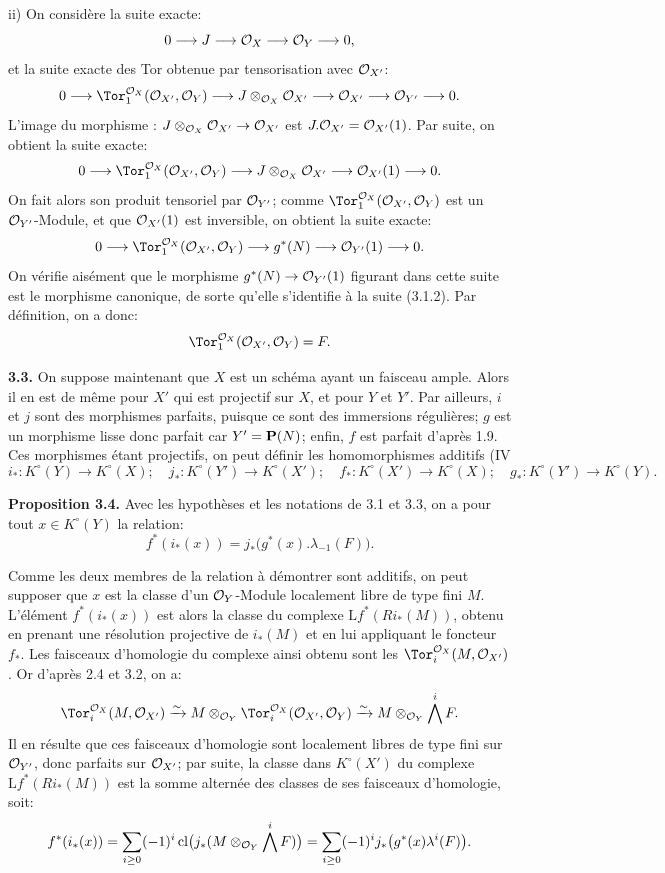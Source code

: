 ii) On considère la suite exacte:
\[
0\longrightarrow J\longrightarrow\mathcal O_X\longrightarrow\mathcal O_Y\longrightarrow0,
\]
et la
suite exacte des Tor obtenue par tensorisation avec \(\mathcal O_{X'}\):
\[
0\longrightarrow
\Tor_1^{\cO_X}(\cO_{X'},\cO_Y)
\longrightarrow
J\otimes_{\cO_X}\cO_{X'}
\longrightarrow
\cO_{X'}
\longrightarrow
\cO_{Y'}
\longrightarrow0.
\]
L'image du morphisme : \(J\otimes_{\mathcal O_X}\mathcal O_{X'}\to\mathcal O_{X'}\) est
\(J.\mathcal O_{X'}=\mathcal O_{X'}(1)\). Par suite, on obtient la suite exacte:
\[
0\longrightarrow
\Tor_1^{\cO_X}(\cO_{X'},\cO_Y)
\longrightarrow
J\otimes_{\cO_X}\cO_{X'}
\longrightarrow
\cO_{X'}(1)
\longrightarrow0.
\]
On fait alors son produit tensoriel par \(\mathcal O_{Y'}\); comme
\(\Tor_1^{\cO_X}(\cO_{X'},\cO_Y)\) est un \(\mathcal O_{Y'}\)-Module, et que
\(\mathcal O_{X'}(1)\) est inversible, on obtient la suite exacte:
\[
0\longrightarrow
\Tor_1^{\cO_X}(\cO_{X'},\cO_Y)
\longrightarrow
g^*(N)
\longrightarrow
\cO_{Y'}(1)
\longrightarrow0.
\]
On vérifie aisément que le morphisme \(g^*(N)\to\mathcal O_{Y'}(1)\) figurant dans cette suite est le morphisme canonique, de sorte qu'elle s'identifie à la suite (3.1.2). Par définition, on a donc:
\[
\Tor_1^{\cO_X}(\cO_{X'},\cO_Y)=F.
\]

\textbf{3.3.} On suppose maintenant que \(X\) est un schéma ayant un faisceau ample. Alors il en est de même pour \(X'\) qui est projectif sur \(X\), et pour \(Y\) et \(Y'\). Par ailleurs, \(i\) et \(j\) sont des morphismes parfaits, puisque ce sont des immersions régulières; \(g\) est un morphisme lisse donc parfait car \(Y'=\mathbf P(N)\); enfin, \(f\) est parfait d'après 1.9. Ces morphismes étant projectifs, on peut définir les homomorphismes additifs (IV
\[
i_*:K^\circ(Y)\to K^\circ(X);\quad
j_*:K^\circ(Y')\to K^\circ(X');\quad
f_*:K^\circ(X')\to K^\circ(X);\quad
g_*:K^\circ(Y')\to K^\circ(Y).
\]

\textbf{Proposition 3.4.} Avec les hypothèses et les notations de 3.1 et 3.3, on a pour tout \(x\in K^\circ(Y)\) la relation:
\[
f^*(i_*(x))=j_*\bigl(g^*(x).\lambda_{-1}(F)\bigr).
\]

Comme les deux membres de la relation à démontrer sont additifs, on peut supposer que \(x\) est la classe d'un \(\mathcal O_Y\)-Module localement libre de type fini \(M\). L'élément \(f^*(i_*(x))\) est alors la classe du complexe \(\mathrm Lf^*(Ri_*(M))\), obtenu en prenant une résolution projective de \(i_*(M)\) et en lui appliquant le foncteur \(f_*\). Les faisceaux d'homologie du complexe ainsi obtenu sont les \(\Tor_i^{\cO_X}(M,\cO_{X'})\). Or d'après 2.4 et 3.2, on a:
\[
\Tor_i^{\cO_X}(M,\cO_{X'})
\xrightarrow{\sim}
M\otimes_{\cO_Y}\Tor_i^{\cO_X}(\cO_{X'},\cO_Y)
\xrightarrow{\sim}
M\otimes_{\cO_Y}\bigwedge^iF.
\]
Il en résulte que ces faisceaux d'homologie sont localement libres de type fini sur \(\mathcal O_{Y'}\), donc parfaits sur \(\mathcal O_{X'}\); par suite, la classe dans \(K^\circ(X')\) du complexe \(\mathrm Lf^*(Ri_*(M))\) est la somme alternée des classes de ses faisceaux d'homologie, soit:
\[
f^*(i_*(x))
=\sum_{i\ge0}(-1)^i\operatorname{cl}
\bigl(j_*(M\otimes_{\mathcal O_Y}\bigwedge^iF)\bigr)
=\sum_{i\ge0}(-1)^i
j_*\bigl(g^*(x)\lambda^i(F)\bigr).
\]

